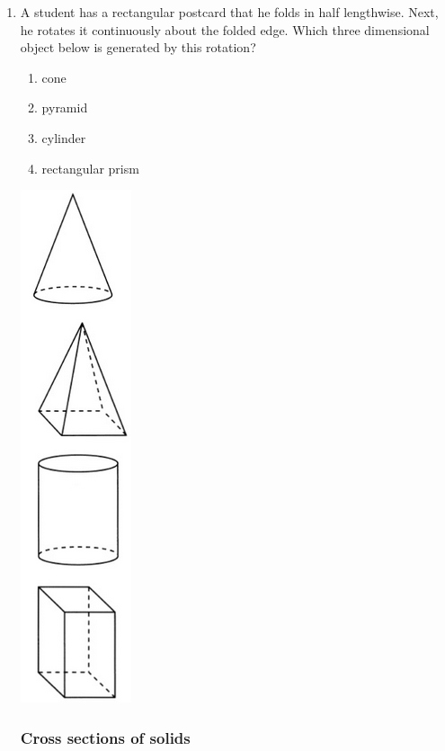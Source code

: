 \documentclass[12pt, twoside]{article}
\begin{document}
\begin{enumerate}
  \item A student has a rectangular postcard that he folds in half lengthwise. Next, he rotates it continuously about the folded edge. Which three dimensional object below is generated by this rotation?
    \begin{multicols}{2}
    \begin{enumerate}
      \item cone
      \item pyramid
      \item cylinder
      \item rectangular prism
    \end{enumerate}
    \includegraphics[scale=0.5]{solids.png}
    \end{multicols}

\newpage
\subsubsection*{Cross sections of solids} %
    

\end{enumerate}
\end{document}
